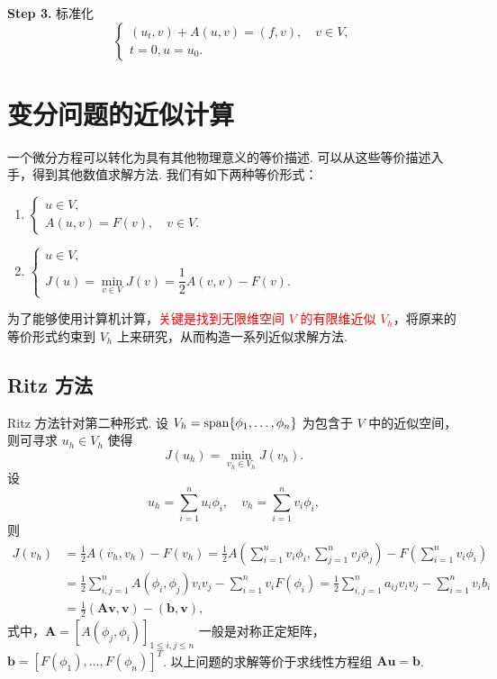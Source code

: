 \noindent\textbf{Step 3.} 标准化
\begin{equation*}
    \begin{cases}
        (u_t,v)+A(u,v)=(f,v),\quad v\in V,\\
        t=0,u=u_0.
    \end{cases}
\end{equation*}

\section{变分问题的近似计算}

一个微分方程可以转化为具有其他物理意义的等价描述. 可以从这些等价描述入手，得到其他数值求解方法. 
我们有如下两种等价形式：
\begin{enumerate}
    \item $\begin{cases} u \in V, \\ A(u, v) = F(v), \quad v \in V. \end{cases}$
    \item $\begin{cases} u \in V, \\ J(u) = \min\limits_{v \in V} J(v) = \dfrac{1}{2}A(v, v) - F(v). \end{cases}$
\end{enumerate}

为了能够使用计算机计算，\textcolor{red}{关键是找到无限维空间 $V$ 的有限维近似 $V_h$}，将原来的等价形式约束到 $V_h$ 上来研究，从而构造一系列近似求解方法.

\subsection{Ritz 方法}

Ritz 方法针对第二种形式. 设 $V_h = \operatorname{span}\{\phi_1, \dots, \phi_n\}$ 为包含于 $V$ 中的近似空间，则可寻求 $u_h \in V_h$ 使得
\begin{equation}
    J(u_h) = \min_{v_h \in V_h} J(v_h).
\end{equation}
设
\begin{equation*}
    u_h = \sum_{i=1}^n u_i \phi_i, \quad v_h = \sum_{i=1}^n v_i \phi_i,
\end{equation*}
则
\begin{align*}
    J(v_h) &= \frac{1}{2}A(v_h, v_h) - F(v_h) = \frac{1}{2}A\left(\sum_{i=1}^n v_i \phi_i, \sum_{j=1}^n v_j \phi_j\right) - F\left(\sum_{i=1}^n v_i \phi_i\right) \\
    &= \frac{1}{2} \sum_{i,j=1}^n A(\phi_i, \phi_j) v_i v_j - \sum_{i=1}^n v_i F(\phi_i) = \frac{1}{2} \sum_{i,j=1}^n a_{ij} v_i v_j - \sum_{i=1}^n v_i b_i \\
    &= \frac{1}{2} (\bm{A}\bm{v}, \bm{v}) - (\bm{b}, \bm{v}),
\end{align*}
式中，$\bm{A} = [A(\phi_j, \phi_i)]_{1 \le i,j \le n}$ 一般是对称正定矩阵，$\bm{b} = [F(\phi_1), \dots, F(\phi_n)]^T$.
以上问题的求解等价于求线性方程组 $\bm{A}\bm{u} = \bm{b}$.

